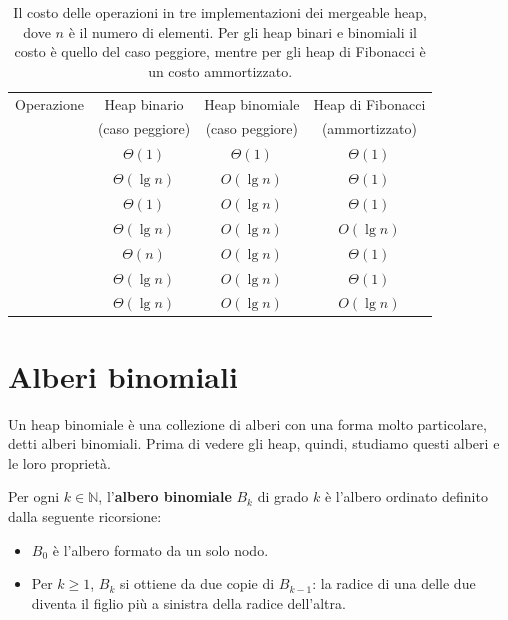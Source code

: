 \begin{table}[htbp]
\centering
\small
\begin{tabular}{lccc}
\toprule
Operazione & Heap binario & Heap binomiale & Heap di Fibonacci \\
 & (caso peggiore) & (caso peggiore) & (ammortizzato) \\
\midrule
\MakeHeap{} & $\Theta(1)$ & $\Theta(1)$ & $\Theta(1)$ \\
\Insert{} & $\Theta(\lg n)$ & $O(\lg n)$ & $\Theta(1)$ \\
\Minimum{} & $\Theta(1)$ & $O(\lg n)$ & $\Theta(1)$ \\
\ExtractMin{} & $\Theta(\lg n)$ & $O(\lg n)$ & $O(\lg n)$ \\
\Union{} & $\Theta(n)$ & $O(\lg n)$ & $\Theta(1)$ \\
\DecreaseKey{} & $\Theta(\lg n)$ & $O(\lg n)$ & $\Theta(1)$ \\
\Delete{} & $\Theta(\lg n)$ & $O(\lg n)$ & $O(\lg n)$ \\
\bottomrule
\end{tabular}
\caption{Il costo delle operazioni in tre implementazioni dei mergeable heap, dove $n$ è il numero di elementi. Per gli heap binari e binomiali il costo è quello del caso peggiore, mentre per gli heap di Fibonacci è un costo ammortizzato.}
\label{tab:hb-confronto}
\end{table}

\section{Alberi binomiali}\label{sec:hb-alberi}
Un heap binomiale è una collezione di alberi con una forma molto particolare, detti alberi binomiali. Prima di vedere gli heap, quindi, studiamo questi alberi e le loro proprietà.

\begin{definizione}\label{def:albero-binomiale}
Per ogni $k \in \mathbb{N}$, l'\textbf{albero binomiale} $B_k$ di grado $k$ è l'albero ordinato definito dalla seguente ricorsione:
\begin{itemize}
    \item $B_0$ è l'albero formato da un solo nodo.
    \item Per $k \ge 1$, $B_k$ si ottiene da due copie di $B_{k-1}$: la radice di una delle due diventa il figlio più a sinistra della radice dell'altra.
\end{itemize}
\end{definizione}

